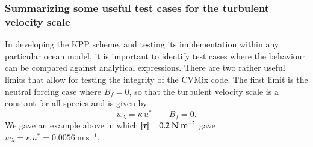\subsubsection{Summarizing some useful test cases for the turbulent velocity scale}

In developing the KPP scheme, and testing its implementation within
any particular ocean model, it is important to identify test cases
where the behaviour can be compared against analytical expressions.  
There are two rather useful limits that allow for testing the
integrity of the CVMix code.  The first limit is the neutral forcing
case where $B_{f} = 0$, so that the turbulent velocity scale is a
constant for all species and is given by
\begin{equation}
 w_{\lambda} = \kappa \, u^{*}  \qquad B_{f} = 0.
\end{equation}
We gave an example above in which $|\mbox{\boldmath $\tau$}| =
0.2~\mbox{N}~\mbox{m}^{-2}$ gave $w_{\lambda} = \kappa \, u^{*} =
0.0056~\mbox{m}~\mbox{s}^{-1}$.

